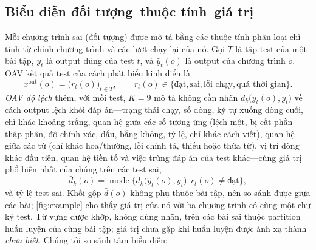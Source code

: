 \documentclass[a4paper,preprint,12pt,authoryear]{elsarticle}
\begin{document}
\subsection{Biểu diễn đối tượng--thuộc tính--giá trị}\label{sec:reps}
Mỗi chương trình sai (đối tượng) được mô tả bằng các thuộc tính phân loại chỉ tính từ chính chương trình và các lượt chạy lại của nó. Gọi $T$ là tập test của một bài tập, $y_t$ là output đúng của test $t$, và $\hat y_t(o)$ là output của chương trình $o$. OAV kết quả test của cách phát biểu kinh điển là
\begin{equation}
x^{\mathrm{out}}(o) = \bigl(r_t(o)\bigr)_{t \in T}, \qquad r_t(o) \in \{\text{đạt}, \text{sai}, \text{lỗi chạy}, \text{quá thời gian}\}.
\end{equation}
\emph{OAV độ lệch} thêm, với mỗi test, $K = 9$ mô tả không cần nhãn $d_k\bigl(\hat y_t(o), y_t\bigr)$ về cách output lệch khỏi đáp án---trạng thái chạy, số dòng, ký tự xuống dòng cuối, chỉ khác khoảng trắng, quan hệ giữa các số tương ứng (lệch một, bị cắt phần thập phân, độ chính xác, dấu, bằng không, tỷ lệ, chỉ khác cách viết), quan hệ giữa các từ (chỉ khác hoa/thường, lỗi chính tả, thiếu hoặc thừa từ), vị trí dòng khác đầu tiên, quan hệ tiền tố và việc trùng đáp án của test khác---cùng giá trị phổ biến nhất của chúng trên các test sai,
\begin{equation}
\bar d_k(o) = \operatorname{mode}\bigl\{ d_k\bigl(\hat y_t(o), y_t\bigr) : r_t(o) \neq \text{đạt} \bigr\},
\end{equation}
và tỷ lệ test sai. Khối gộp $\bar d(o)$ không phụ thuộc bài tập, nên so sánh được giữa các bài; \cref{fig:example} cho thấy giá trị của nó với ba chương trình có cùng một chữ ký test. Từ vựng được khớp, không dùng nhãn, trên các bài sai thuộc partition huấn luyện của cùng bài tập; giá trị chưa gặp khi huấn luyện được ánh xạ thành \emph{chưa biết}. Chúng tôi so sánh tám biểu diễn:
\end{document}
